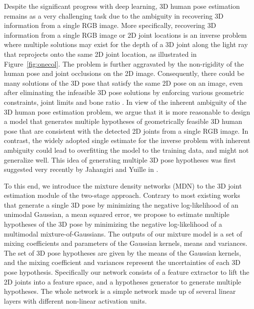 \documentclass[10pt,twocolumn,letterpaper]{article}
\begin{document}
Despite the significant progress with deep learning, 3D human pose estimation remains as a very challenging task due to the ambiguity in recovering 3D information from a single RGB image. More specifically, recovering 3D information from a single RGB image or 2D joint locations is an inverse problem \cite{bishop1994mixture} where multiple solutions may exist for the depth of a 3D joint along the light ray that reprojects onto the same 2D joint location, as illustrated in Figure~\ref{fig:onecol}.   The problem is further aggravated by the non-rigidity of the human pose and joint occlusions on the 2D image. Consequently, there could be many solutions of the 3D pose that satisfy the same 2D pose on an image, even after eliminating the infeasible 3D pose solutions by enforcing various geometric constraints, \eg joint limits \cite{akhter2015pose} and bone ratio \cite{zhou2017towards} \etc. In view of the inherent ambiguity of the 3D human pose estimation problem, we argue that it is more reasonable to design a model that generates multiple hypotheses of geometrically feasible 3D human pose that are consistent with the detected 2D joints from a single RGB image. In contrast, the widely adopted single estimate for the inverse problem with inherent ambiguity could lead to overfitting the model to the training data, and might not generalize well. This idea of generating multiple 3D pose hypotheses was first suggested very recently by Jahangiri and Yuille in \cite{jahangiri2017generating}.    

To this end, we introduce the mixture density networks (MDN) \cite{bishop1994mixture, ye2017occlusion} to the 3D joint estimation module of the two-stage approach. Contrary to most existing works that generate a single 3D pose by minimizing the negative log-likelihood of an unimodal Gaussian, \ie a mean squared error, we propose to estimate multiple hypotheses of the 3D pose by minimizing the negative log-likelihood of a multimodal mixture-of-Gaussians. The outputs of our mixture model is a set of mixing coefficients and parameters of the Gaussian kernels, \ie means and variances. The set of 3D pose hypotheses are given by the means of the Gaussian kernels, and the mixing coefficient and variances represent the uncertainties of each 3D pose hypothesis. 
Specifically our network consists of a feature extractor to lift the 2D joints into a feature space,  and a hypotheses generator to generate multiple hypotheses.  
The whole network is a simple network made up of several linear layers with different non-linear activation units.
\end{document}
